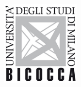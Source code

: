 \documentclass[12pt]{article}
\begin{document}
\begin{titlepage}

\includegraphics[width=0.3\textwidth]{logo.jpg}\\%
 

\vfill %

\end{titlepage}
\end{document}

